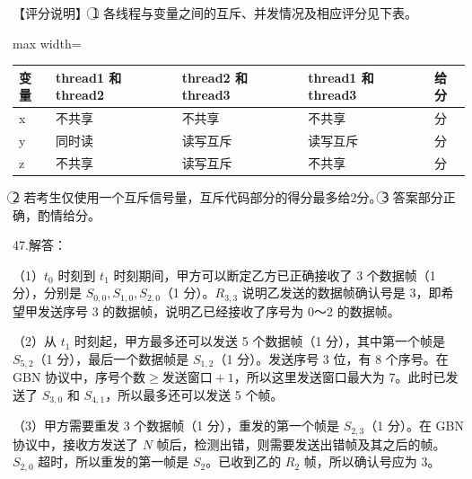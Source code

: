 \documentclass[UTF8,11pt]{ctexart}
\begin{document}
【评分说明】 \textcircled{1} 各线程与变量之间的互斥、并发情况及相应评分见下表。


\begin{center}\begin{adjustbox}{max width=\linewidth}\begin{tabular}{|>{\raggedright\arraybackslash}p{\dimexpr(\linewidth-10\tabcolsep-6\arrayrulewidth)/5\relax}|>{\raggedright\arraybackslash}p{\dimexpr(\linewidth-10\tabcolsep-6\arrayrulewidth)/5\relax}|>{\raggedright\arraybackslash}p{\dimexpr(\linewidth-10\tabcolsep-6\arrayrulewidth)/5\relax}|>{\raggedright\arraybackslash}p{\dimexpr(\linewidth-10\tabcolsep-6\arrayrulewidth)/5\relax}|>{\raggedright\arraybackslash}p{\dimexpr(\linewidth-10\tabcolsep-6\arrayrulewidth)/5\relax}|}\hline
变量 & thread1 和 thread2 & thread2 和 thread3 & thread1 和 thread3 & 给分\\\hline
x & 不共享 & 不共享 & 不共享 & 1 分\\\hline
y & 同时读 & 读写互斥 & 读写互斥 & 3 分\\\hline
z & 不共享 & 读写互斥 & 不共享 & 1 分\\\hline\end{tabular}\end{adjustbox}\end{center}

\textcircled{2} 若考生仅使用一个互斥信号量，互斥代码部分的得分最多给2分。\textcircled{3} 答案部分正确，酌情给分。


47.解答：


（1）\(\displaystyle t_0\) 时刻到 \(\displaystyle t_1\) 时刻期间，甲方可以断定乙方已正确接收了 3 个数据帧（1 分），分别是 \(\displaystyle S_{0,\allowbreak 0},\allowbreak S_{1,\allowbreak 0},\allowbreak S_{2,\allowbreak 0}\)（1 分）。\(\displaystyle R_{3,\allowbreak 3}\) 说明乙发送的数据帧确认号是 3，即希望甲发送序号 3 的数据帧，说明乙已经接收了序号为 0～2 的数据帧。


（2）从 \(\displaystyle t_1\) 时刻起，甲方最多还可以发送 5 个数据帧（1 分），其中第一个帧是 \(\displaystyle S_{5,\allowbreak 2}\)（1 分），最后一个数据帧是 \(\displaystyle S_{1,\allowbreak 2}\)（1 分）。发送序号 3 位，有 8 个序号。在 GBN 协议中，\(\displaystyle \text{序号个数}\geq\text{发送窗口}+1\)，所以这里发送窗口最大为 7。此时已发送了 \(\displaystyle S_{3,\allowbreak 0}\) 和 \(\displaystyle S_{4,\allowbreak 1}\)，所以最多还可以发送 5 个帧。


（3）甲方需要重发 3 个数据帧（1 分），重发的第一个帧是 \(\displaystyle S_{2,\allowbreak 3}\)（1 分）。在 GBN 协议中，接收方发送了 \(\displaystyle N\) 帧后，检测出错，则需要发送出错帧及其之后的帧。\(\displaystyle S_{2,\allowbreak 0}\) 超时，所以重发的第一帧是 \(\displaystyle S_2\)。已收到乙的 \(\displaystyle R_2\) 帧，所以确认号应为 3。
\end{document}
